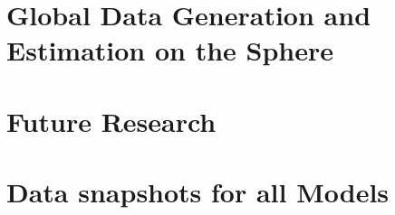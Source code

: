 \documentclass[phd]{uncgdissertation}
\begin{document}
\chapter{Global Data Generation and Estimation on the Sphere}


\chapter{Future Research}






\appendix
\chapter{Data snapshots for all Models}  \label{appendixA}


\backmatter %
\end{document}

